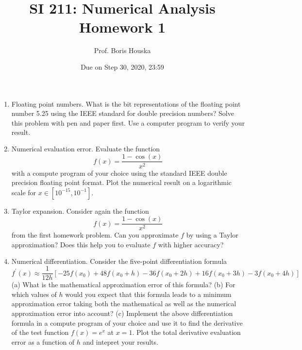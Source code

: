 \documentclass[11pt]{article}
\begin{document}
\author{Prof. Boris Houska}
\date{
Due on Step 30, 2020, 23:59}
\title{SI 211: Numerical Analysis Homework 1 }
\maketitle

\medskip
\begin{enumerate}

\item  Floating point numbers. What is the bit representations of the floating point number 5.25 using the IEEE standard for double precision numbers? Solve this problem with pen and paper first. Use a computer program to verify your result.
\item  Numerical evaluation error. Evaluate the function
$$
f(x)=\frac{1-\cos (x)}{x^{2}}
$$
with a compute program of your choice using the standard IEEE double precision floating point format. Plot the numerical result on a logarithmic scale for $x \in\left[10^{-15}, 10^{-1}\right]$.
\item  Taylor expansion. Consider again the function
$$
f(x)=\frac{1-\cos (x)}{x^{2}}
$$
from the first homework problem. Can you approximate $f$ by using a Taylor approximation? Does this help you to evaluate $f$ with higher accuracy?
\item  Numerical differentiation.
Consider the five-point differentiation formula
$$
f^{\prime}(x) \approx \frac{1}{12 h}\left[-25 f\left(x_{0}\right)+48 f\left(x_{0}+h\right)-36 f\left(x_{0}+2 h\right)+16 f\left(x_{0}+3 h\right)-3 f\left(x_{0}+4 h\right)\right]
$$
\subitem (a) What is the mathematical approximation error of this formula?
\subitem(b) For which values of $h$ would you expect that this formula leads to a minimum approximation error taking both the mathematical as well as the numerical approximation error into account?
\subitem(c) Implement the above differentiation formula in a compute program of your choice and use it to find the derivative of the test function $f(x)=e^{x}$ at $x=1 .$ Plot the total derivative evaluation error as a function of $h$ and intepret your results.
\end{enumerate}
\end{document}
